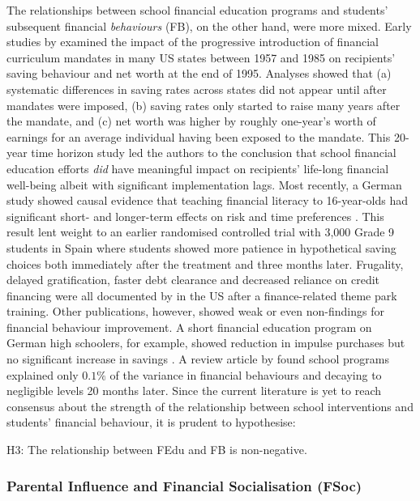 The relationships between school financial education programs and students' subsequent financial \emph{behaviours} (FB), on the other hand, were more mixed. Early studies by \textcite{bernheim:2001} examined the impact of the progressive introduction of financial curriculum mandates in many US states between 1957 and 1985 on recipients' saving behaviour and net worth at the end of 1995. Analyses showed that (a) systematic differences in saving rates across states did not appear until after mandates were imposed, (b) saving rates only started to raise many years after the mandate, and (c) net worth was higher by roughly one-year's worth of earnings for an average individual having been exposed to the mandate. This 20-year time horizon study led the authors to the conclusion that school financial education efforts \emph{did} have meaningful impact on recipients' life-long financial well-being albeit with significant implementation lags. Most recently, a German study showed causal evidence that teaching financial literacy to 16-year-olds had significant short- and longer-term effects on risk and time preferences \parencite{sutter:2020}. This result lent weight to an earlier randomised controlled trial with 3,000 Grade 9 students in Spain \parencite{bover:2018} where students showed more patience in hypothetical saving choices both immediately after the treatment and three months later. Frugality, delayed gratification, faster debt clearance and decreased reliance on credit financing were all documented by \textcite{carlin:2012b} in the US after a finance-related theme park training. Other publications, however, showed weak or even non-findings for financial behaviour improvement. A short financial education program on German high schoolers, for example, showed reduction in impulse purchases but no significant increase in savings \parencite{luhrmann:2015}. A review article by \textcite{fernandes:2014} found school programs explained only $0.1\%$ of the variance in financial behaviours and decaying to negligible levels 20 months later. Since the current literature is yet to reach consensus about the strength of the relationship between school interventions and students' financial behaviour, it is prudent to hypothesise:
\begin{MAEitemize}
    \item[H3:] The relationship between FEdu and FB is non-negative.
\end{MAEitemize}

\subsubsection{Parental Influence and Financial Socialisation (FSoc)}

